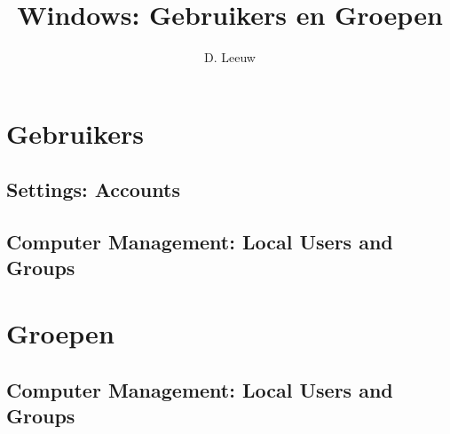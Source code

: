 \documentclass[a4paper,12pt,twoside,titlepage]{article}
\author{D. Leeuw}
\title{Windows: Gebruikers en Groepen}
\date{\today\\
0.0.0
\vfill
\raggedright
\copyright\ 2025 Dennis Leeuw\\
}
\begin{document}

\maketitle



\section{Gebruikers}

\subsection{Settings: Accounts}

\subsection{Computer Management: Local Users and Groups}


\section{Groepen}

\subsection{Computer Management: Local Users and Groups}



\printindex
\end{document}
